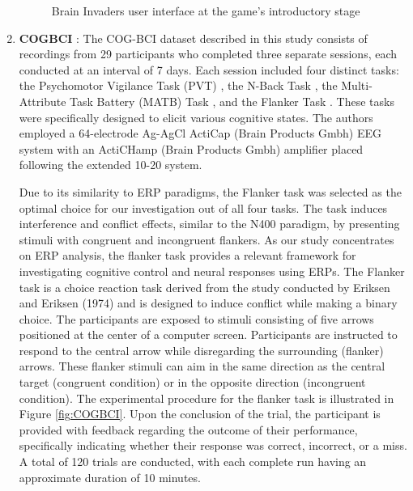 \begin{enumerate}
\begin{figure}
    \caption{Brain Invaders user interface at the game's introductory stage \cite{brainInvaders15a}}
    \label{fig: BrainInvaders}
    
    
\end{figure}

\item \textbf{COGBCI} \cite{cogbci}: The COG-BCI dataset described in this study consists of recordings from 29 participants who completed three separate sessions, each conducted at an interval of 7 days. Each session included four distinct tasks: the Psychomotor Vigilance Task (PVT) \cite{dinges1985microcomputer}, the N-Back Task \cite{kirchner1958age}, the Multi-Attribute Task Battery (MATB) Task \cite{santiago2011multi}, and the Flanker Task \cite{eriksen1974effects}. These tasks were specifically designed to elicit various cognitive states. The authors employed a 64-electrode Ag-AgCl ActiCap (Brain Products Gmbh) EEG system with an ActiCHamp (Brain Products Gmbh) amplifier placed following the extended 10-20 system.  

\smallskip

Due to its similarity to ERP paradigms, the Flanker task was selected as the optimal choice for our investigation out of all four tasks. The task induces interference and conflict effects, similar to the N400 paradigm, by presenting stimuli with congruent and incongruent flankers. As our study concentrates on ERP analysis, the flanker task provides a relevant framework for investigating cognitive control and neural responses using ERPs. The Flanker task is a choice reaction task derived from the study conducted by Eriksen and Eriksen (1974) \cite{eriksen1974effects} and is designed to induce conflict while making a binary choice. The participants are exposed to stimuli consisting of five arrows positioned at the center of a computer screen. Participants are instructed to respond to the central arrow while disregarding the surrounding (flanker) arrows. These flanker stimuli can aim in the same direction as the central target (congruent condition) or in the opposite direction (incongruent condition). The experimental procedure for the flanker task is illustrated in Figure \ref{fig:COGBCI}. Upon the conclusion of the trial, the participant is provided with feedback regarding the outcome of their performance, specifically indicating whether their response was correct, incorrect, or a miss. A total of 120 trials are conducted, with each complete run having an approximate duration of 10 minutes.   


\end{enumerate}

